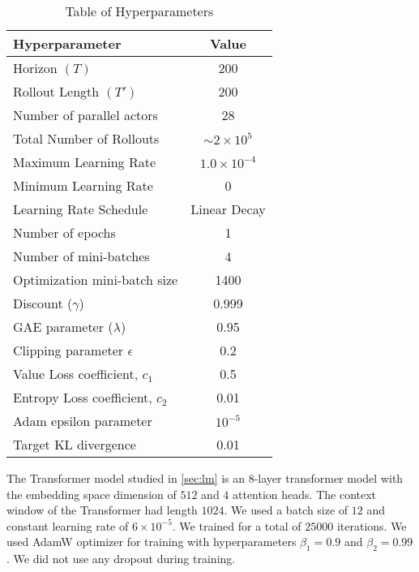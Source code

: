 \begin{table}[ht]
    \centering
    \begin{tabular}{lc}
        \hline
        Hyperparameter & Value \\
        \hline
        Horizon $(T)$ & 200 \\
        Rollout Length $(T')$ & 200 \\
        Number of parallel actors & 28 \\
        Total Number of Rollouts & $\sim 2 \times 10^5$ \\
        Maximum Learning Rate & $1.0 \times 10^{-4}$ \\
        Minimum Learning Rate & 0 \\
        Learning Rate Schedule & Linear Decay \\
        Number of epochs & 1 \\
        Number of mini-batches & 4 \\
        Optimization mini-batch size & 1400 \\
        Discount ($\gamma$) & 0.999 \\
        GAE parameter ($\lambda$) & 0.95 \\
        Clipping parameter $\epsilon$ & 0.2 \\
        Value Loss coefficient, $c_1$ & 0.5 \\
        Entropy Loss coefficient, $c_2$ & 0.01 \\
        Adam epsilon parameter & $10^{-5}$ \\
        Target KL divergence & 0.01 \\
        \hline
    \end{tabular}
    \caption{Table of Hyperparameters}
    \label{tab:ppo_hyperparameters}
\end{table}

The Transformer model studied in \autoref{sec:lm} is an 8-layer transformer model with the embedding space dimension of $512$ and $4$ attention heads. The context window of the Transformer had length $1024$. We used a batch size of $12$ and constant learning rate of $6 \times 10^{-5}$. We trained for a total of $25000$ iterations. We used AdamW optimizer for training with hyperparameters $\beta_1 = 0.9$ and $\beta_2 = 0.99$. We did not use any dropout during training.